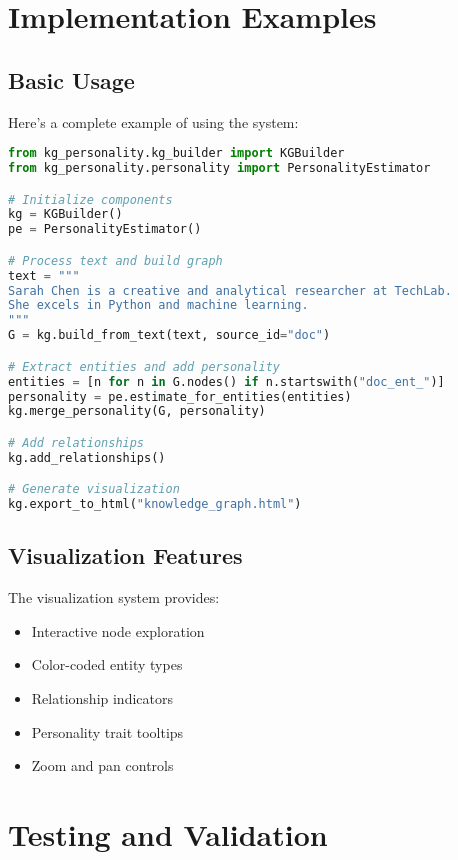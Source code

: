 \documentclass[11pt]{article}
\begin{document}
\section{Implementation Examples}

\subsection{Basic Usage}
Here's a complete example of using the system:

\begin{lstlisting}[language=Python, caption=Basic Usage Example]
from kg_personality.kg_builder import KGBuilder
from kg_personality.personality import PersonalityEstimator

# Initialize components
kg = KGBuilder()
pe = PersonalityEstimator()

# Process text and build graph
text = """
Sarah Chen is a creative and analytical researcher at TechLab.
She excels in Python and machine learning.
"""
G = kg.build_from_text(text, source_id="doc")

# Extract entities and add personality
entities = [n for n in G.nodes() if n.startswith("doc_ent_")]
personality = pe.estimate_for_entities(entities)
kg.merge_personality(G, personality)

# Add relationships
kg.add_relationships()

# Generate visualization
kg.export_to_html("knowledge_graph.html")
\end{lstlisting}

\subsection{Visualization Features}
The visualization system provides:

\begin{itemize}
    \item Interactive node exploration
    \item Color-coded entity types
    \item Relationship indicators
    \item Personality trait tooltips
    \item Zoom and pan controls
\end{itemize}

\section{Testing and Validation}
\end{document}

